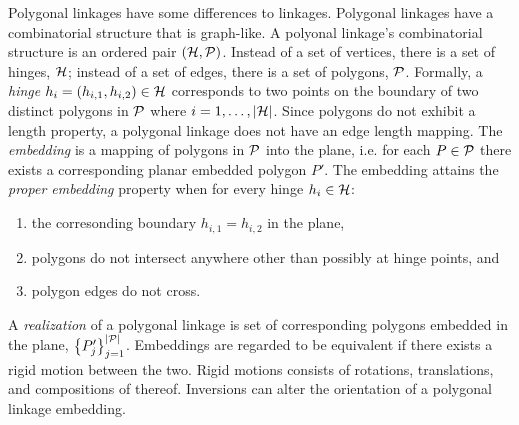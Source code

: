Polygonal linkages have some differences to linkages.  Polygonal linkages have a combinatorial 
structure that is graph-like.  A polyonal linkage's combinatorial structure is an ordered pair 
$\left({\cal H},{\cal P} \right)$.  Instead of a set of vertices, there is a set of hinges, ${\cal H}$;  instead 
of a set of edges, there is a set of polygons, ${\cal P}$. Formally, a \textit{hinge} 
$h_i=\left(h_{i,1},h_{i,2}\right)\in {\cal H}$ corresponds to two points on the boundary of two distinct 
polygons in ${\cal P}$ where $i = 1, \dots, \vert{\cal H}\vert$.  Since polygons do not 
exhibit a length property, a polygonal linkage does not have an edge length mapping.  The 
\textit{embedding} is a mapping of polygons in ${\cal P}$ into the plane, i.e. for each $P \in {\cal P}$ 
there exists a corresponding planar embedded polygon $P'$.  The embedding attains the 
\textit{proper embedding} property when for every hinge $h_i \in {\cal H}$:
\begin{enumerate}
 \item the corresonding boundary $h_{i,1} = h_{i,2}$ in the plane, 
 \item polygons do not intersect anywhere other than possibly at hinge points, and
 \item polygon edges do not cross.
\end{enumerate}
A \textit{realization} of a polygonal linkage is set of corresponding polygons embedded in the 
plane, $\left\lbrace P_j ' \right\rbrace_{j=1}^{\left\vert {\cal P} \right\vert}$. Embeddings are 
regarded to be equivalent if there exists a rigid motion between the two. Rigid motions 
consists of rotations, translations, and compositions of thereof.  Inversions can alter the 
orientation of a polygonal linkage embedding.  

% 

